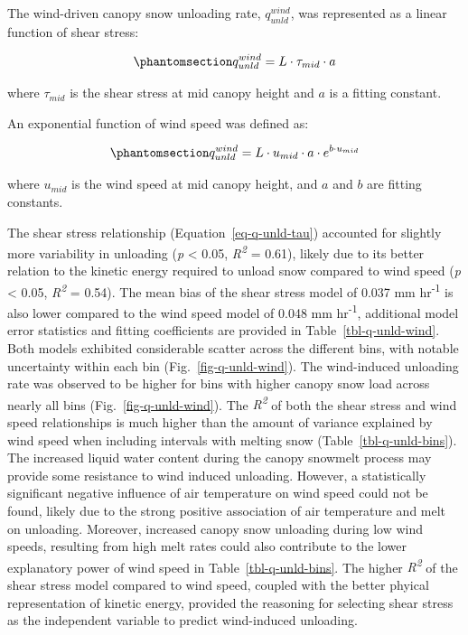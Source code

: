 \documentclass[
  letterpaper,
  DIV=11,
  numbers=noendperiod]{scrartcl}
\begin{document}
The wind-driven canopy snow unloading rate, \(q_{unld}^{wind}\), was
represented as a linear function of shear stress:

\begin{equation}\phantomsection\label{eq-q-unld-tau}{
q_{unld}^{wind} = L \cdot \tau_{mid} \cdot a
}\end{equation}

where \(\tau_{mid}\) is the shear stress at mid canopy height and \(a\)
is a fitting constant.

An exponential function of wind speed was defined as:

\begin{equation}\phantomsection\label{eq-q-unld-wind}{
q_{unld}^{wind} = L \cdot u_{mid} \cdot a \cdot e^{b\cdot u_{mid}}
}\end{equation}

where \(u_{mid}\) is the wind speed at mid canopy height, and \(a\) and
\(b\) are fitting constants.

The shear stress relationship (Equation~\ref{eq-q-unld-tau}) accounted
for slightly more variability in unloading (\emph{p} \textless{} 0.05,
\emph{R\textsuperscript{2}} = 0.61), likely due to its better relation
to the kinetic energy required to unload snow compared to wind speed
(\emph{p} \textless{} 0.05, \emph{R\textsuperscript{2}} = 0.54). The
mean bias of the shear stress model of 0.037 mm hr\textsuperscript{-1}
is also lower compared to the wind speed model of 0.048 mm
hr\textsuperscript{-1}, additional model error statistics and fitting
coefficients are provided in Table~\ref{tbl-q-unld-wind}. Both models
exhibited considerable scatter across the different bins, with notable
uncertainty within each bin (Fig.~\ref{fig-q-unld-wind}). The
wind-induced unloading rate was observed to be higher for bins with
higher canopy snow load across nearly all bins
(Fig.~\ref{fig-q-unld-wind}). The \emph{R\textsuperscript{2}} of both
the shear stress and wind speed relationships is much higher than the
amount of variance explained by wind speed when including intervals with
melting snow (Table~\ref{tbl-q-unld-bins}). The increased liquid water
content during the canopy snowmelt process may provide some resistance
to wind induced unloading. However, a statistically significant negative
influence of air temperature on wind speed could not be found, likely
due to the strong positive association of air temperature and melt on
unloading. Moreover, increased canopy snow unloading during low wind
speeds, resulting from high melt rates could also contribute to the
lower explanatory power of wind speed in Table~\ref{tbl-q-unld-bins}.
The higher \emph{R\textsuperscript{2}} of the shear stress model
compared to wind speed, coupled with the better phyical representation
of kinetic energy, provided the reasoning for selecting shear stress as
the independent variable to predict wind-induced unloading.
\end{document}
